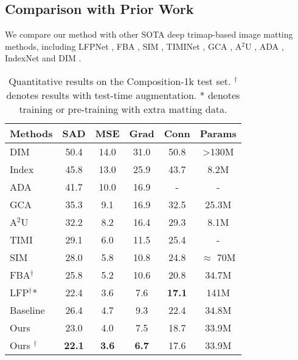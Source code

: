 \documentclass[10pt,twocolumn,letterpaper]{article}
\begin{document}
\subsection{Comparison with Prior Work}
We  compare our method with other SOTA deep trimap-based image matting methods, including LFPNet \cite{lfpnet}, FBA \cite{fba}, SIM \cite{sim}, TIMINet \cite{timinet}, GCA \cite{gca}, A$^2$U \cite{a2u}, ADA \cite{adamatting}, IndexNet \cite{indexnet} and DIM \cite{deepmatting}. 
\begin{table}[h]
    \begin{center}
     \caption{Quantitative results on the Composition-1k test set. $^{\dagger}$ denotes results with test-time augmentation. * denotes training or pre-training with extra matting data.}
    \begin{tabular}{l|cccc|c}
        \hline
        Methods & SAD & MSE  & Grad & Conn & Params \\
        \hline
        
       
        DIM\cite{deepmatting}                & 50.4 & 14.0 & 31.0 & 50.8 &\textgreater 130M\\
        Index\cite{indexnet}           & 45.8 & 13.0 & 25.9 & 43.7&8.2M \\
        ADA \cite{adamatting}        &41.7& 10.0&16.9&-&-\\
        GCA \cite{gca}        & 35.3 & 9.1 & 16.9 & 32.5 &25.3M \\
        A$^{2}$U \cite{a2u}     & 32.2 & 8.2 & 16.4 & 29.3 &8.1M \\
        TIMI \cite{timinet}    & 29.1 & 6.0 & 11.5 & 25.4 & -\\
        SIM \cite{sim}        & 28.0 & 5.8 & 10.8 & 24.8 & $\approx$ 70M\\
        FBA$^{\dagger}$ \cite{fba}        & 25.8 & 5.2 & 10.6 & 20.8 & 34.7M\\
        LFP$^{\dagger}$*\cite{lfpnet}  & 22.4 & 3.6 & 7.6 & \textbf{17.1} & 141M\\
        \hline
        Baseline & 26.4 & 4.7 & 9.3 & 22.4& 34.8M \\
        Ours & 23.0 & 4.0 & 7.5 & 18.7& 33.9M \\
        Ours $^{\dagger}$ & \textbf{22.1} & \textbf{3.6} & \textbf{6.7} & 17.6 &33.9M\\
        \hline
    \end{tabular}
    \label{tab:comp1k}
    \end{center}
\end{table}
\end{document}
